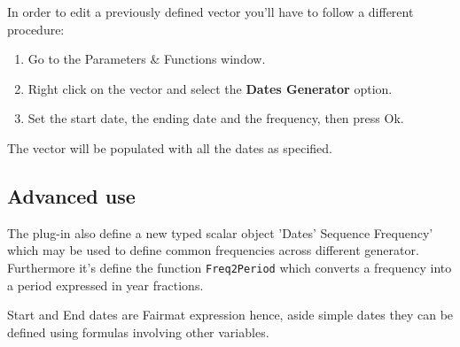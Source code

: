 In order to edit a previously defined  vector  you'll have to follow a different procedure:
\begin{enumerate}
\item Go to the Parameters \& Functions window.
\item Right click on the vector and select the \textbf{Dates Generator} option.
\item Set the start date, the ending date and the frequency, then press Ok.
\end{enumerate}
The vector will be populated with all the dates as specified.

\subsection{Advanced use}
The plug-in also define a new typed scalar object 'Dates' Sequence Frequency' which may be used to define common frequencies across different generator. Furthermore it's define the function \texttt{Freq2Period} which converts a frequency into a period expressed in year fractions.

Start and End dates are Fairmat expression hence, aside simple dates they can be defined using formulas involving other variables. 

